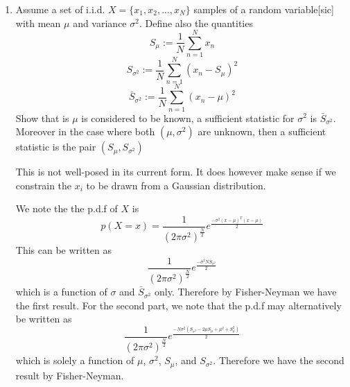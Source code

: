 \documentclass{article}
\newcommand{\chapternumber}{3}
\newenvironment{QandA}{\begin{enumerate}[label=\chapternumber.\arabic*]\bfseries\boldmath}
	{\end{enumerate}}
\newenvironment{answered}{\par\bigskip\normalfont\unboldmath}{}
\begin{document}
\begin{QandA}
		\begin{answered}
			Note that the above expression may be written as 
			\[\theta+(X^T\Sigma_\eta^{-1}X)^{-1}X^T\Sigma_\eta^{-1} \eta\]
			The covariance of this expression is just
			\[(X^T\Sigma_\eta^{-1}X)^{-1}\]
			\newline
			The likelihood function here is given by 
			\[p(y=a)=p(\eta=a-\theta^TX)=\frac{1}{((2\pi)^d |\Sigma_\eta|)^{\frac{1}{2}}}\prod_{n=1}^{N}e^\frac{-(a-\theta^TX)^T\Sigma_\eta^{-1} (a-\theta^TX)}{2}\]
			From this, we obtain the Fisher information matrix as simply $(X^T\Sigma_\eta^{-1}X)$, and parameter efficiency via Cramer-Rao follows trivially.
		\end{answered}
	
		\item Assume a set of i.i.d. $X=\{x_1,x_2,...,x_N\}$ samples of a random variable[sic] with mean $\mu$ and variance $\sigma^2$. Define also the quantities
		\[S_\mu:=\frac{1}{N}\sum_{n=1}^{N}x_n\]
		\[S_{\sigma^2}:=\frac{1}{N}\sum_{n=1}^{N}(x_n-S_\mu)^2\]
		\[\bar{S}_{\sigma^2}:=\frac{1}{N}\sum_{n=1}^{N}(x_n-\mu)^2\]
		Show that is $\mu$ is considered to be known, a sufficient statistic for $\sigma^2$ is $\bar S_{\sigma^2}$. Moreover in the case where both $(\mu,\sigma^2)$ are unknown, then a sufficient statistic is the pair $(S_\mu,S_{\sigma^2})$
		
		\begin{answered}
			This is not well-posed in its current form. It does however make sense if we constrain the $x_i$ to be drawn from a Gaussian distribution. 
			
			We note the the p.d.f of $X$ is 
			\[p(X=x)=\frac{1}{(2\pi\sigma^2)^\frac{N}{2}}e^\frac{-\sigma^2(x-\mu)^T(x-\mu)}{2}\]
			This can be written as
			\[\frac{1}{(2\pi\sigma^2)^\frac{N}{2}}e^\frac{-\sigma^2 N\bar{S}_{\sigma^2}}{2}\]
			which is a function of $\sigma$ and $\bar{S}_{\sigma^2}$ only. Therefore by Fisher-Neyman we have the first result.
			For the second part, we note that the p.d.f may alternatively be written as
			\[\frac{1}{(2\pi\sigma^2)^\frac{N}{2}}e^\frac{-N\sigma^2(S_{\sigma^2}-2\mu S_\mu+\mu^2+S_\mu^2)}{2}\]
			which is solely a function of $\mu$, $\sigma^2$, $S_\mu$, and $S_{\sigma^2}$. Therefore we have the second result by Fisher-Neyman. 
		\end{answered}
	
	\end{QandA}
	
\end{document}
